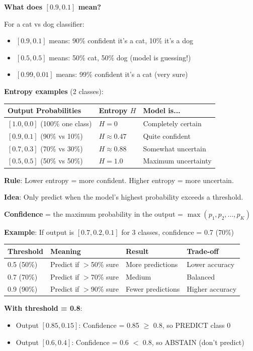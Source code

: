 \documentclass[11pt,a4paper]{article}
\begin{document}
\begin{examplebox}
\textbf{What does $[0.9, 0.1]$ mean?}

For a cat vs dog classifier:
\begin{itemize}[leftmargin=*,nosep]
\item $[0.9, 0.1]$ means: 90\% confident it's a cat, 10\% it's a dog
\item $[0.5, 0.5]$ means: 50\% cat, 50\% dog (model is guessing!)
\item $[0.99, 0.01]$ means: 99\% confident it's a cat (very sure)
\end{itemize}

\textbf{Entropy examples} (2 classes):  \newline
\begin{tabular}{@{}l|l|l@{}}
\textbf{Output Probabilities} & \textbf{Entropy $H$} & \textbf{Model is...} \\
\hline
$[1.0, 0.0]$ (100\% one class) & $H = 0$ & Completely certain \\
$[0.9, 0.1]$ (90\% vs 10\%) & $H \approx 0.47$ & Quite confident \\
$[0.7, 0.3]$ (70\% vs 30\%) & $H \approx 0.88$ & Somewhat uncertain \\
$[0.5, 0.5]$ (50\% vs 50\%) & $H = 1.0$ & Maximum uncertainty \\
\end{tabular}

\textbf{Rule}: Lower entropy = more confident. Higher entropy = more uncertain.
\end{examplebox}

\begin{examplebox}

\textbf{Idea}: Only predict when the model's highest probability exceeds a threshold.

\textbf{Confidence} = the maximum probability in the output = $\max(p_1, p_2, ..., p_K)$

\textbf{Example}: If output is $[0.7, 0.2, 0.1]$ for 3 classes, confidence = 0.7 (70\%)

\begin{tabular}{@{}l|l|l|l@{}}
\textbf{Threshold} & \textbf{Meaning} & \textbf{Result} & \textbf{Trade-off} \\
\hline
0.5 (50\%) & Predict if $>$50\% sure & More predictions & Lower accuracy \\
0.7 (70\%) & Predict if $>$70\% sure & Medium & Balanced \\
0.9 (90\%) & Predict if $>$90\% sure & Fewer predictions & Higher accuracy \\
\end{tabular}

\textbf{With threshold = 0.8}:
\begin{itemize}[leftmargin=*,nosep]
\item Output $[0.85, 0.15]$: Confidence = 0.85 $\geq$ 0.8, so PREDICT class 0
\item Output $[0.6, 0.4]$: Confidence = 0.6 $<$ 0.8, so ABSTAIN (don't predict)
\end{itemize}
\end{examplebox}
\end{document}
